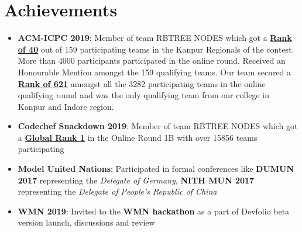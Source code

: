 \documentclass[a4paper,timesnewroman,11pt, twoside]{article}
\numberwithin{equation}{section}
\newcommand{\resumeItem}[2]{
  \item\small{
    \textbf{#1}{: #2 \vspace{-5pt}}
  }
}
\newcommand{\resumeSubItem}[2]{\resumeItem{#1}{#2}\vspace{-3pt}}
\newcommand{\resumeSubHeadingListStart}{\begin{itemize}[leftmargin=*]}
\newcommand{\resumeSubHeadingListEnd}{\end{itemize}}
\begin{document}
\section{Achievements}
  \resumeSubHeadingListStart
    \resumeSubItem{ACM-ICPC 2019}
      {Member of team RBTREE NODES which got a \href{https://www.codechef.com/public/rankings/ACM18KOL}{\textbf{Rank of 40}} out of 159 participating teams in the Kanpur Regionals of the contest. More than 4000 participants participated in the online round. Received an Honourable Mention amongst the 159 qualifying teams. Our team secured a \href{https://www.codechef.com/rankings/ACMIND18}{\textbf{Rank of 621}} amongst all the 3282 participating teams in the online qualifying round and was the only qualifying team from our college in Kanpur and Indore region.}
    \resumeSubItem{Codechef Snackdown 2019}
      {Member of team RBTREE NODES which got a \href{https://www.codechef.com/rankings/SNCK1B19?order=asc&search=rbtree&sortBy=rank}{\textbf{Global Rank 1}} in the Online Round 1B with over 15856 teams participating}
    \resumeSubItem{Model United Nations}
      {Participated in formal conferences like \textbf{DUMUN 2017} representing the {\textit{Delegate of Germany}}, \textbf{NITH MUN 2017} representing the \textit{ Delegate of People's Republic of China} }
    \resumeSubItem{WMN 2019}
      {Invited to the \textbf{WMN hackathon} as a part of Devfolio beta version launch, discussions and review}
  \resumeSubHeadingListEnd

\end{document}
